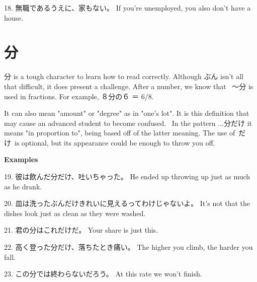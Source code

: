 \par{18. 無職であるうえに、家もない。 \hfill\break
If you're unemployed, you also don't have a house. }
      
\section{分}
 
\par{ 分 is a tough character to learn how to read correctly. Although ぶん isn't all that difficult, it does present a challenge. After a number, we know that  ～分 is used in fractions. For example, ８分の６ ＝ 6\slash 8. }
 
\par{It can also mean "amount" or "degree" as in "one's lot". It is this definition that may cause an advanced student to become confused.  In the pattern \dothyp{}\dothyp{}\dothyp{}分だけ it means "in proportion to", being based off of the latter meaning. The use of だけ is optional, but its appearance could be enough to throw you off. }
 
\begin{center}
\textbf{Examples }
\end{center}

\par{19. 彼は飲んだ分だけ、吐いちゃった。 \hfill\break
He ended up throwing up just as much as he drank. }
 
\par{20. 皿は洗ったぶんだけきれいに見えるってわけじゃないよ。 \hfill\break
It's not that the dishes look just as clean as they were washed. }
 
\par{21. 君の分はこれだけだ。 \hfill\break
Your share is just this. }
 
\par{22. 高く登った分だけ、落ちたとき痛い。 \hfill\break
The higher you climb, the harder you fall. }
 
\par{23. この分では終わらないだろう。 \hfill\break
At this rate we won't finish. }
    
